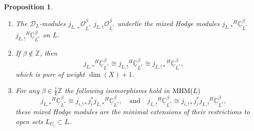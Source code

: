 \documentclass[JEP,XML,SOM,Unicode,published]{cedram}
\let\mathds\mathbb
\newcommand{\quand}{\quad\text{and}\quad}
\newtheorem{prop}[thm]{Proposition}
\newcommand{\dC}{{\mathds C}}\let\C\dC
\newcommand{\dZ}{{\mathds Z}}\let\mbz\dZ\let\Z\dZ
\newcommand{\cO}{\mathcal{O}}\let\O\cO
\newcommand{\MHM}{\textup{MHM}}
\begin{document}
\begin{prop}\label{prop:CBetaHodgeExt}
\begin{enumerate}
\item
The $\mathscr{D}_{L}$\nobreakdash-mod\-ules $j_{L,+} \cO^\beta_{L^{*}}$ \resp $j_{L,\dag} \cO^\beta_{L^{*}}$ underlie the mixed Hodge modules $j_{L,*} {^{H\!}}\underline{\dC}^\beta_{L^*}$
\resp $j_{L,!} {^{H\!}}\underline{\dC}^\beta_{L^*}$ on $L$.

\item
If
$\beta\notin\dZ$, then
\[
j_{L,*} {^{H\!}}\underline{\dC}^\beta_{L^*} \cong j_{L,!} {^{H\!}}\underline{\dC}^\beta_{L^*}\cong j_{L,!*} {^{H\!}}\underline{\dC}^\beta_{L^*},
\]
which is pure of weight $\dim(X)+1$.

\item
For any $\beta\in\frac{1}{k}\dZ$ the following isomorphisms hold in $\MHM(L)$
\[
j_{L,*} {^{H\!}}\underline{\dC}^\beta_{L^*} \cong
j_{i,!*} j_i^{*} j_{L,*} {^{H\!}}\underline{\dC}^\beta_{L^*},
\quand
j_{L,!} {^{H\!}}\underline{\dC}^\beta_{L^*}\cong
j_{i,!*} j_i^{*} j_{L,!} {^{H\!}}\underline{\dC}^\beta_{L^*},
\]
\ie these mixed Hodge modules are the minimal extensions of their restrictions to open sets $L_{U_i}\subset L$.
\end{enumerate}
\end{prop}
\end{document}
